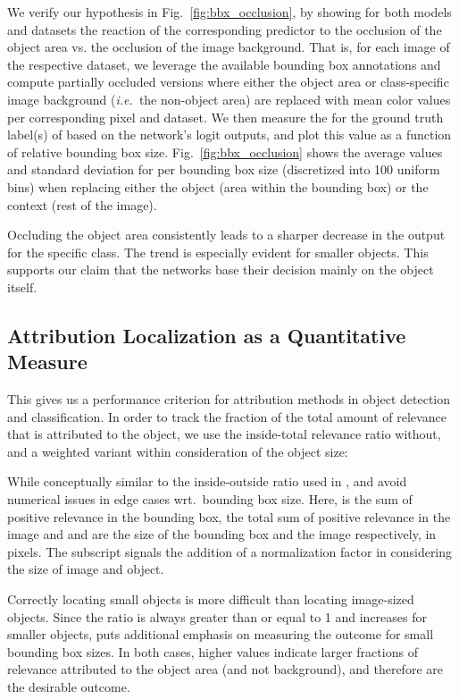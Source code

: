 \documentclass[conference]{IEEEtran}
\def\ie{\emph{i.e.~}}
\def\wrt{wrt.~}
\begin{document}
We verify our hypothesis in Fig.~\ref{fig:bbx_occlusion},
by showing for both models and datasets the reaction of the corresponding predictor  to the occlusion of the object area vs. the occlusion of the image background.
That is, for each image  of the respective dataset, we leverage the available bounding box annotations and compute partially occluded versions  where either the object area or class-specific image background (\ie the non-object area) are replaced with mean color values per corresponding pixel and dataset.
We then measure the  for the ground truth label(s) of  based on the network's logit outputs, and plot this value as a function of relative bounding box size.
Fig.~\ref{fig:bbx_occlusion} shows the average values and standard deviation for  per bounding box size (discretized into 100 uniform bins) when replacing either the object (area within the bounding box) or the context (rest of the image).

Occluding the object area consistently leads to a sharper decrease in the output for the specific class.
The trend is especially evident for smaller objects.
This supports our claim that the networks base their decision mainly on the object itself.


\subsection{Attribution Localization as a Quantitative Measure}
This gives us a performance criterion for attribution methods in object detection and classification.
In order to track the fraction of the total amount of relevance that is attributed to the object,
we use the inside-total relevance ratio  without, and a weighted variant  within consideration of the object size:

While conceptually similar to the inside-outside ratio used in \cite{lapuschkin2016analyzing},
 and  avoid numerical issues in edge cases \wrt bounding box size.
Here,  is the sum of positive relevance in the bounding box,
 the total sum of positive relevance in the image and
 and  are the size of the bounding box and the image respectively, in pixels.
The subscript  signals the addition of a normalization factor in  considering the size of image and object.

Correctly locating small objects is more difficult than locating image-sized objects.
Since the ratio  is always greater than or equal to 1 and increases for smaller objects,
 puts additional emphasis on measuring the outcome for small bounding box sizes.
In both cases, higher values indicate larger fractions of relevance attributed to the object area (and not background),
and therefore are the desirable outcome.
\end{document}
